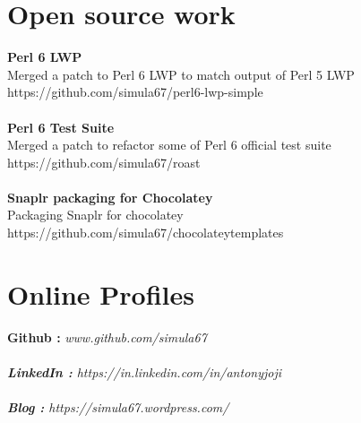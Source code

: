 \documentclass[line,margin]{res}
\begin{document}
\begin{resume}
\section{Open source work}
{\bf Perl 6 LWP}\\
Merged a patch to Perl 6 LWP to match output of Perl 5 LWP\\
https://github.com/simula67/perl6-lwp-simple\\ \\
{\bf Perl 6 Test Suite}\\
Merged a patch to refactor some of Perl 6 official test suite\\
https://github.com/simula67/roast\\ \\
{\bf Snaplr packaging for Chocolatey}\\
Packaging Snaplr for chocolatey\\
https://github.com/simula67/chocolateytemplates\\

\section{Online Profiles}
{\bf Github :} \it{www.github.com/simula67} \\ \\ 
{\bf LinkedIn :} \it{https://in.linkedin.com/in/antonyjoji} \\ \\
{\bf Blog :} \it{https://simula67.wordpress.com/} \\

\end{resume}
\end{document}
